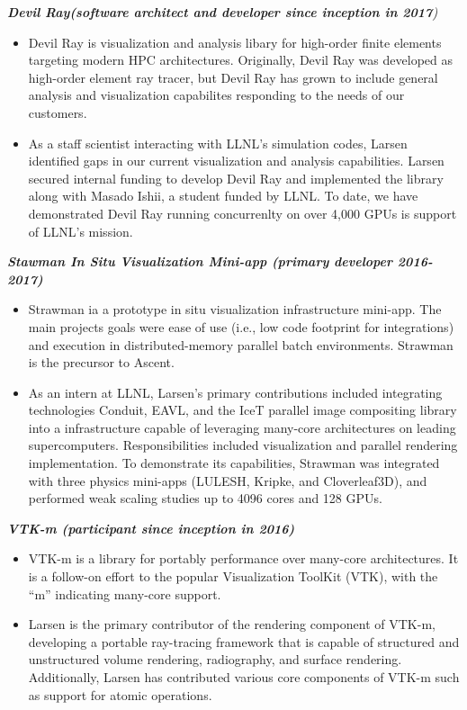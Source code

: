\documentclass[margin,line]{res}
\begin{document}
\begin{resume}
{\em \textbf{Devil Ray(software architect and developer since inception in 2017}) }
\begin{itemize}
	\item Devil Ray is visualization and analysis libary for high-order finite elements targeting modern HPC
  architectures. Originally, Devil Ray was developed as high-order element ray tracer, but Devil Ray has grown to include general analysis and visualization capabilites responding to the needs of our customers.
	\item As a staff scientist interacting with LLNL's simulation codes, Larsen identified gaps in our
  current visualization and analysis capabilities. Larsen secured internal funding to develop Devil Ray
  and implemented the library along with Masado Ishii, a student funded by LLNL. To date, we have demonstrated
  Devil Ray running concurrenlty on over 4,000 GPUs is support of LLNL's mission.
\end{itemize}

{\em \textbf{Stawman In Situ Visualization Mini-app (primary developer 2016-2017)} }

\begin{itemize}
	\item Strawman ia a prototype in situ visualization infrastructure mini-app. The main projects goals were ease of use (i.e., low code footprint for integrations) and execution in distributed-memory parallel batch environments. Strawman is the precursor to Ascent.
	\item As an intern at LLNL, Larsen's primary contributions included integrating technologies Conduit, EAVL, and the IceT parallel image compositing library into a infrastructure capable of leveraging many-core architectures on leading supercomputers. Responsibilities included visualization and parallel rendering implementation. To demonstrate its capabilities, Strawman was integrated with three physics mini-apps (LULESH, Kripke, and Cloverleaf3D), and performed weak scaling studies up to 4096 cores and 128 GPUs.
\end{itemize}

{\em \textbf{VTK-m (participant since inception in  2016)} }
\begin{itemize}
	\item VTK-m is a library for portably performance over many-core architectures. It is a follow-on effort
	to the popular Visualization ToolKit (VTK), with the “m” indicating many-core support.
	\item Larsen is the primary contributor of the rendering component of VTK-m, developing a portable ray-tracing framework that is capable of structured and unstructured volume rendering, radiography, and surface rendering. Additionally, Larsen has contributed various core components of VTK-m such as support for atomic operations.
\end{itemize}


\end{resume}
\end{document}
